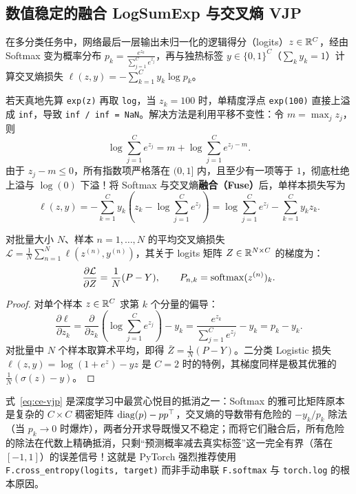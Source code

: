\subsection{数值稳定的融合 LogSumExp 与交叉熵 VJP}

在多分类任务中，网络最后一层输出未归一化的逻辑得分（logits）$z \in \mathbb{R}^C$，经由 Softmax 变为概率分布 $p_k = \frac{e^{z_k}}{\sum_{j=1}^C e^{z_j}}$，再与独热标签 $y \in \{0, 1\}^C$（$\sum_k y_k = 1$）计算交叉熵损失 $\ell(z, y) = -\sum_{k=1}^C y_k \log p_k$。

若天真地先算 \texttt{exp(z)} 再取 \texttt{log}，当 $z_k = 100$ 时，单精度浮点 \texttt{exp(100)} 直接上溢成 \texttt{inf}，导致 \texttt{inf / inf = NaN}。解决方法是利用平移不变性：令 $m = \max_j z_j$，则
\begin{equation}
  \log \sum_{j=1}^C e^{z_j} = m + \log \sum_{j=1}^C e^{z_j - m}.
  \label{eq:lse-trick}
\end{equation}
由于 $z_j - m \le 0$，所有指数项严格落在 $(0, 1]$ 内，且至少有一项等于 $1$，彻底杜绝上溢与 $\log(0)$ 下溢！将 Softmax 与交叉熵\textbf{融合（Fuse）}后，单样本损失写为
\[
  \ell(z, y) = -\sum_{k=1}^C y_k \left(z_k - \log \sum_{j=1}^C e^{z_j}\right) = \log \sum_{j=1}^C e^{z_j} - \sum_{k=1}^C y_k z_k.
\]

\begin{thmBox}
\begin{proposition}
\label{prop:ce-vjp}
对批量大小 $N$、样本 $n = 1, \dots, N$ 的平均交叉熵损失 $\mathcal{L} = \frac{1}{N}\sum_{n=1}^N \ell(z^{(n)}, y^{(n)})$，其关于 logits 矩阵 $Z \in \mathbb{R}^{N \times C}$ 的梯度为：
\begin{equation}
  \frac{\partial \mathcal{L}}{\partial Z} = \frac{1}{N}(P - Y), \qquad P_{n,k} = \operatorname{softmax}(z^{(n)})_k.
  \label{eq:ce-vjp}
\end{equation}
\end{proposition}
\begin{proof}
对单个样本 $z \in \mathbb{R}^C$ 求第 $k$ 个分量的偏导：
\[
  \frac{\partial \ell}{\partial z_k} = \frac{\partial}{\partial z_k}\left(\log \sum_{j=1}^C e^{z_j}\right) - y_k = \frac{e^{z_k}}{\sum_{j=1}^C e^{z_j}} - y_k = p_k - y_k.
\]
对批量中 $N$ 个样本取算术平均，即得 $\bar{Z} = \frac{1}{N}(P - Y)$。二分类 Logistic 损失 $\ell(z, y) = \log(1 + e^z) - y z$ 是 $C=2$ 时的特例，其梯度同样是极其优雅的 $\frac{1}{N}(\sigma(z) - y)$。
\end{proof}
\end{thmBox}

式~\eqref{eq:ce-vjp} 是深度学习中最赏心悦目的抵消之一：Softmax 的雅可比矩阵原本是复杂的 $C \times C$ 稠密矩阵 $\operatorname{diag}(p) - pp^\top$，交叉熵的导数带有危险的 $-y_k / p_k$ 除法（当 $p_k \to 0$ 时爆炸），两者分开求导既慢又不稳定；而将它们融合后，所有危险的除法在代数上精确抵消，只剩“预测概率减去真实标签”这一完全有界（落在 $[-1, 1]$）的误差信号！这就是 PyTorch 强烈推荐使用 \texttt{F.cross\_entropy(logits, target)} 而非手动串联 \texttt{F.softmax} 与 \texttt{torch.log} 的根本原因。

